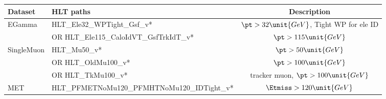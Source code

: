\scriptsize
\begin{tabular}{l|l|c}
  \hline
  Dataset        & HLT paths                                    & Description\\
  \hline \hline
  \ttfamily EGamma         & \ttfamily HLT\_Ele32\_WPTight\_Gsf\_v*                 & $\pt>32\unit{GeV}$, Tight WP for ele ID  \\
                 & \ttfamily OR HLT\_Ele115\_CaloIdVT\_GsfTrkIdT\_v*      & $\pt>115\unit{GeV}$  \\
  \hline
  \ttfamily SingleMuon     & \ttfamily HLT\_Mu50\_v*                                & $\pt>50\unit{GeV}$ \\
                 & \ttfamily OR HLT\_OldMu100\_v*                         & $\pt>100\unit{GeV}$ \\
                 & \ttfamily OR HLT\_TkMu100\_v*                          & tracker muon, $\pt>100\unit{GeV}$ \\
  \hline
  \ttfamily MET            & \ttfamily HLT\_PFMETNoMu120\_PFMHTNoMu120\_IDTight\_v* & $\Etmiss>120\unit{GeV}$ \\
  \hline
\end{tabular}

